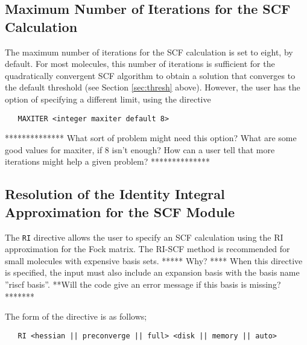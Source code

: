 
\subsection{Maximum Number of Iterations for the SCF Calculation}
\label{sec:max}


The maximum number of iterations for the SCF calculation is set to eight, by
default.  For most molecules, this number of iterations is sufficient for
the quadratically convergent SCF algorithm to obtain a
solution that converges to the default threshold (see Section  
\ref{sec:thresh} above).  However, the user has the option of specifying
a different limit, using the directive

\begin{verbatim}
   MAXITER <integer maxiter default 8>
\end{verbatim}

\Large
**************
What sort of problem might need this option?  What are some
good values for maxiter, if 8 isn't enough?
How can a user tell that more iterations might help a given problem?
**************
\normalsize

\subsection{Resolution of the Identity Integral Approximation for the SCF Module}

The \verb+RI+ directive allows the user to specify an SCF calculation
using the RI approximation for the Fock matrix.  The RI-SCF method is
recommended for small molecules with expensive basis sets.
\Large
***** Why? ****
\normalsize
When this directive is specified, the input must also include an expansion
basis with the basis name ''riscf basis''.
\Large
**Will the code give an error message if this basis is missing?*******
\normalsize

The form of the directive is as follows;

\begin{verbatim}
   RI <hessian || preconverge || full> <disk || memory || auto>
\end{verbatim}

